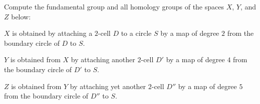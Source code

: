 Compute the fundamental group and all homology groups of the spaces
$X$, $Y$, and $Z$ below:
\begin{alist}
\item $X$ is obtained by attaching a $2$-cell $D$ to a circle $S$ by a
map of degree $2$ from the boundary circle of $D$ to $S$.
\item $Y$ is obtained from $X$ by attaching another $2$-cell $D'$ by a
map of degree $4$ from the boundary circle of $D'$ to $S$.
\item $Z$ is obtained from $Y$ by attaching yet another $2$-cell $D''$
by a map of degree $5$ from the boundary circle of $D''$ to $S$.
\end{alist}
